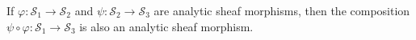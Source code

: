 If $\varphi: \mathcal{S}_1 \rightarrow \mathcal{S}_2$ and $\psi: \mathcal{S}_2 \rightarrow \mathcal{S}_3$ are analytic sheaf morphisms, then the composition $\psi \circ \varphi: \mathcal{S}_1 \rightarrow \mathcal{S}_3$ is also an analytic sheaf morphism.
